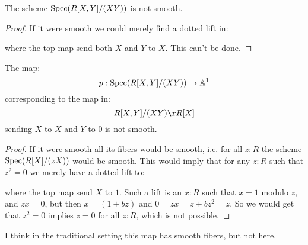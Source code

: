\begin{lemma}
The scheme $\operatorname{Spec}(R[X,Y]/(XY))$ is not smooth.
\end{lemma}

\begin{proof}
If it were smooth we could merely find a dotted lift in:
 \begin{center}
    \end{center}
    where the top map send both $X$ and $Y$ to $X$. This can't be done.
\end{proof}

\begin{lemma}
The map:
\[
p:\operatorname{Spec}(R[X,Y]/(XY))\to \mathbb{A}^1
\] 
corresponding to the map in:
\[
R[X,Y]/(XY) \r R[X]
\]
sending $X$ to $X$ and $Y$ to $0$ is not smooth.
\end{lemma}

\begin{proof}
If it were smooth all its fibers would be smooth, i.e. for all $z:R$ the scheme $\operatorname{Spec}(R[X]/(zX))$ would be smooth. This would imply that for any $z:R$ such that $z^2=0$ we merely have a dotted lift to:
 \begin{center}
    \end{center} 
    where the top map send $X$ to $1$. Such a lift is an $x:R$ such that $x=1$ modulo $z$, and $zx=0$, but then $x=(1+bz)$ and $0=zx=z+bz^2=z$. So we would get that $z^2=0$ implies $z=0$ for all $z:R$, which is not possible.
\end{proof}

I think in the traditional setting this map has smooth fibers, but not here.

